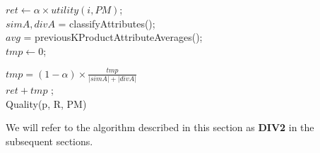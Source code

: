 \begin{algorithm}[ht]
  \DontPrintSemicolon

  $ret \gets \alpha \times utility(i, PM)$; \\
  $simA, divA$ = classifyAttributes(); \\
  $avg$ = previousKProductAttributeAverages(); \\
  $tmp \gets 0$;\\

  $tmp = (1-\alpha) \times \frac{tmp} {\lvert simA\rvert + \lvert divA\rvert}$\\
  \Return $ret + tmp$ ;\\
  \caption{Quality(p, R, PM)}
  \label{algo:quality2}
\end{algorithm}

We will refer to the algorithm described in this section as \textbf{DIV2} in the subsequent sections.
